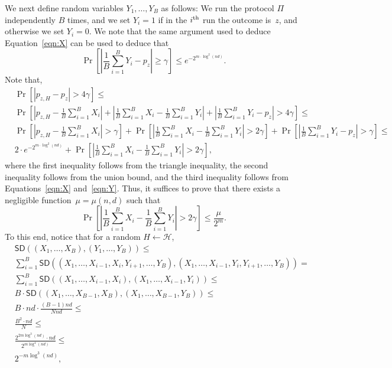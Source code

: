 \documentclass[11pt]{article}
\theoremstyle{plain}
\theoremstyle{definition}
\numberwithin{equation}{section}
\numberwithin{equation}{section} \newcommand{\aka} {also known as\ }
\newcommand{\Hc}{\mathcal H}
\newcommand{\1}{\mathbf{1}}
\newcommand{\ith}[1]{{#1}\textsuperscript{th}}
\newcommand{\SD}{\mathsf{SD}}
\theoremstyle{remark}
\begin{document}
We next define random variables $Y_1,\ldots,Y_B$ as follows: We run the protocol
$\Pi$ independently $B$ times, and we set $Y_i=1$ if in the $\ith{i}$ run the
outcome is~$z$, and otherwise we set $Y_i=0$.  We note that the same argument
used to deduce Equation~\eqref{eqn:X} can be used to deduce that
\begin{equation}\label{eqn:Y}
  \Pr\left[\left|\frac{1}{B}\sum_{i=1}^B Y_i- p_{z}\right|\geq\gamma\right]\leq e^{-2^{m\cdot \log^2(nd)}}.
\end{equation}
Note that,
\begin{align*}
  &\Pr\left[\left|p_{z,H}-p_z\right|>4\gamma\right]\leq\\
  &\Pr\left[\left|p_{z,H}-\frac{1}{B}\sum_{i=1}^B X_i\right|+ \left|\frac{1}{B}\sum_{i=1}^B X_i-\frac{1}{B}\sum_{i=1}^B Y_i\right|+ \left|\frac{1}{B}\sum_{i=1}^B Y_i-p_z\right|>4\gamma\right]\leq\\
  &\Pr\left[\left|p_{z,H}-\frac{1}{B}\sum_{i=1}^B X_i\right|>\gamma\right]+\Pr\left[\left|\frac{1}{B}\sum_{i=1}^B X_i-\frac{1}{B}\sum_{i=1}^B Y_i\right|>2\gamma\right]+\Pr\left[\left|\frac{1}{B}\sum_{i=1}^B Y_i-p_z\right|>\gamma\right]\leq\\
  &2\cdot e^{-2^{m\cdot \log^2(nd)}}+\Pr\left[\left|\frac{1}{B}\sum_{i=1}^B
      X_i-\frac{1}{B}\sum_{i=1}^B Y_i\right|>2\gamma\right],
\end{align*}
where the first inequality follows from the triangle inequality, the second
inequality follows from the union bound, and the third inequality
follows from Equations~\eqref{eqn:X} and~\eqref{eqn:Y}.  Thus, it suffices to
prove that there exists a negligible function~$\mu=\mu(n,d)$ such that
$$
\Pr\left[\left|\frac{1}{B}\sum_{i=1}^B X_i-\frac{1}{B}\sum_{i=1}^B
    Y_i\right|>2\gamma\right]\leq\frac{\mu}{2^m}.
$$
To this end, notice that for a random $H\leftarrow\Hc$,
\begin{align*}
  &\SD\left(\left(X_1,\ldots,X_B\right),\left(Y_1,\ldots, Y_B\right)\right)\leq \\
  &\sum_{i=1}^B \SD\left(\left(X_1,\ldots,X_{i-1},X_i,Y_{i+1},\ldots,Y_B\right),\left(X_1,\ldots,X_{i-1},Y_i,Y_{i+1},\ldots,Y_B\right)\right)=\\
  &\sum_{i=1}^B \SD\left(\left(X_1,\ldots,X_{i-1},X_i\right),\left(X_1,\ldots,X_{i-1},Y_i\right)\right)\leq\\
  &B\cdot \SD\left(\left(X_1,\ldots,X_{B-1},X_B\right),\left(X_1,\ldots,X_{B-1},Y_B\right)\right)\leq\\
  &B\cdot nd\cdot\frac{(B-1)nd}{Nnd}\leq \\
  &\frac{B^2\cdot nd}{N}\leq\\
  &\frac{2^{2m\log^3(nd)}\cdot nd}{2^{m\log^4(nd)}}\leq\\
  &2^{-m\log^3(nd)},
\end{align*}
\end{document}
